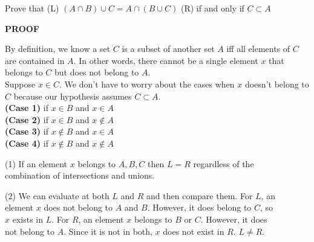 \documentclass{article}
\begin{document}

\begin{center}
Prove that (L) $(A \cap B) \cup C = A \cap (B \cup C)$ (R) if and only if $C \subset A$ 
\end{center}

\begin{flushleft}
\textbf{PROOF}
\end{flushleft}

\begin{flushleft}
 By definition, we know a set $C$ is a subset of another set $A$ iff all elements of $C$ are contained in $A$. In other words, there cannot be a single element $x$ that belongs to $C$ but does not belong to $A$. \\
 \vspace{.2cm}
 Suppose $x \in C$. We don't have to worry about the cases when $x$ doesn't belong to $C$ because our hypothesis assumes $C \subset A$.\\
  \vspace{.2cm}
 \textbf{(Case 1)} if $x \in B$ and $x \in A$ \\
  \vspace{.2cm}
 \textbf{(Case 2)} if $x \in B$ and $x \not \in A$\\ 
  \vspace{.2cm}
 \textbf{(Case 3)} if $x \not \in B$ and $x \in A$\\ 
  \vspace{.2cm}
 \textbf{(Case 4)} if $x \not \in B$ and $x \not \in A$\\ 
\end{flushleft}

\begin{flushleft}
 (1)\:\: If an element $x$ belongs to $A,B,C$ then $L=R$ regardless of the \\
 \qquad combination of intersections and unions. \\
 \end{flushleft}

\begin{flushleft}
 (2)\:\: We can evaluate at both $L$ and $R$ and then compare them. For $L$, an \\
 \qquad element $x$ does not belong to $A$ and $B$. However, it does belong to $C$, so \\
 \qquad $x$ exists in $L$. For $R$, an element $x$ belongs to $B$ or $C$. However, it does \\
 \qquad not belong to $A$. Since it is not in both, $x$ does not exist in $R$. $L \neq R$.\\
\end{flushleft}
\end{document}
